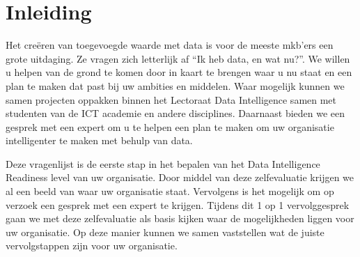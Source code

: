 \chapter{Inleiding}
Het creëren van toegevoegde waarde met data is voor de meeste mkb’ers een grote uitdaging. Ze vragen zich letterlijk af “Ik heb data, en wat nu?”. We willen u helpen van de grond te komen door in kaart te brengen waar u nu staat en een plan te maken dat past bij uw ambities en middelen. Waar mogelijk kunnen we samen projecten oppakken binnen het Lectoraat Data Intelligence samen met studenten van de ICT academie en andere disciplines. Daarnaast bieden we een gesprek met een expert om u te helpen een plan te maken om uw organisatie intelligenter te maken met behulp van data. 

Deze vragenlijst is de eerste stap in het bepalen van het Data Intelligence Readiness level van uw organisatie. Door middel van deze zelfevaluatie krijgen we al een beeld van waar uw organisatie staat. Vervolgens is het mogelijk om op verzoek een gesprek met een expert te krijgen. Tijdens dit 1 op 1 vervolggesprek gaan we met deze zelfevaluatie als basis kijken waar de mogelijkheden liggen voor uw organisatie. Op deze manier kunnen we samen vaststellen wat de juiste vervolgstappen zijn voor uw organisatie.  